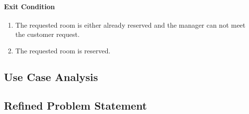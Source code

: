 \paragraph{Exit Condition}\label{exit-condition-2}

\begin{enumerate}
\def\labelenumi{\arabic{enumi}.}
\tightlist
\item
  The requested room is either already reserved and the manager can not
  meet the customer request.
\item
  The requested room is reserved.
\end{enumerate}






\subsection{Use Case Analysis}
%
%


\subsection{Refined Problem Statement}
%
%

